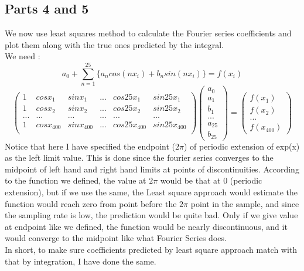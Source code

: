 \documentclass[11pt, a4paper]{article}
\begin{document}
\subsection{Parts 4 and 5}
We now use least squares method to calculate the Fourier series coefficients and plot them along with the true ones predicted by the integral.
\\
We need :
\begin{equation}\label{eq:fs2}
a_0 + \sum_{n=1}^{25} \{a_n cos(nx_i) + b_n sin(nx_i)\} = f(x_i)
\end{equation}
\begin{equation}\label{eq:2}
\begin{pmatrix}
1 & cosx_1 & sinx_1 & ... & cos25x_1 & sin25x_1 \\
1 & cosx_2 & sinx_2 & ... & cos25x_2 & sin25x_2 \\
... & ... & ... & ... & ... & ... \\
1 & cosx_{400} & sinx_{400 }& ... & cos25x_{400} & sin25x_{400} \\
\end{pmatrix}
\begin{pmatrix}
a_0 \\ a_1 \\ b_1 \\ ... \\ a_{25} \\ b_{25}
\end{pmatrix}
=
\begin{pmatrix}
f(x_1) \\ f(x_2) \\ ... \\ f(x_{400})
\end{pmatrix}
\end{equation}
Notice that here I have specified the endpoint ($2\pi$) of periodic extension of exp(x) as the left limit value. This is done since the fourier series converges to the midpoint of left hand and right hand limits at points of discontinuities. According to the function we defined, the value at $2\pi$ would be that at $0$ (periodic extension), but if we use the same, the Least square approach would estimate the function would reach zero from point before the $2\pi$ point in the sample, and since the sampling rate is low, the prediction would be quite bad. Only if we give value at endpoint like we defined, the function would be nearly discontinuous, and it would converge to the midpoint like what Fourier Series does.
\\
In short, to make sure coefficients predicted by least square approach match with that by integration, I have done the same.
\end{document}
